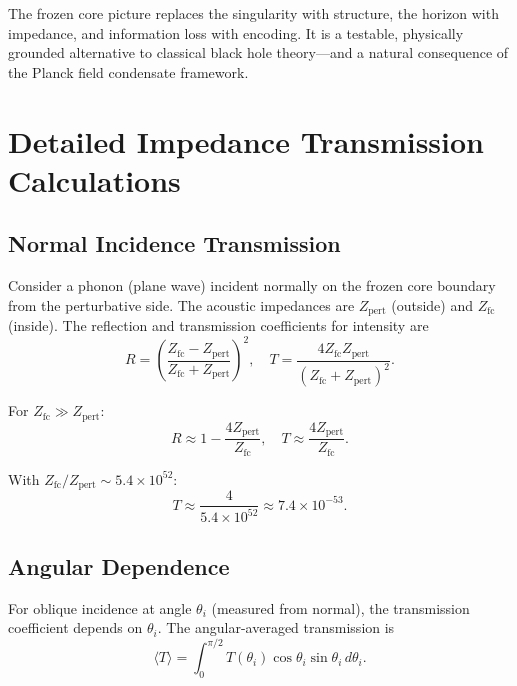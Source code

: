 \documentclass[12pt,a4paper]{article}
\newcommand{\Zfc}{Z_\text{fc}}
\newcommand{\Zpert}{Z_\text{pert}}
\theoremstyle{definition}
\begin{document}
The frozen core picture replaces the singularity with structure, the horizon with impedance, and information loss with encoding. It is a testable, physically grounded alternative to classical black hole theory—and a natural consequence of the Planck field condensate framework.

\appendix

\section{Detailed Impedance Transmission Calculations}
\label{app:impedance_transmission}

\subsection{Normal Incidence Transmission}
\label{app:normal_incidence}

Consider a phonon (plane wave) incident normally on the frozen core boundary from the perturbative side. The acoustic impedances are $\Zpert$ (outside) and $\Zfc$ (inside). The reflection and transmission coefficients for intensity are
\begin{equation}
R = \left( \frac{\Zfc - \Zpert}{\Zfc + \Zpert} \right)^2, \quad T = \frac{4\Zfc \Zpert}{(\Zfc + \Zpert)^2}.
\label{eq:RT_normal}
\end{equation}

For $\Zfc \gg \Zpert$:
\begin{equation}
R \approx 1 - \frac{4\Zpert}{\Zfc}, \quad T \approx \frac{4\Zpert}{\Zfc}.
\label{eq:RT_approx}
\end{equation}

With $\Zfc/\Zpert \sim 5.4 \times 10^{52}$:
\begin{equation}
T \approx \frac{4}{5.4 \times 10^{52}} \approx 7.4 \times 10^{-53}.
\label{eq:T_numerical}
\end{equation}

\subsection{Angular Dependence}
\label{app:angular_dependence}

For oblique incidence at angle $\theta_i$ (measured from normal), the transmission coefficient depends on $\theta_i$. The angular-averaged transmission is
\begin{equation}
\langle T \rangle = \int_0^{\pi/2} T(\theta_i) \cos\theta_i \sin\theta_i \, d\theta_i.
\label{eq:T_angular_average}
\end{equation}
\end{document}

